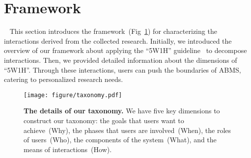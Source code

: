 \section{Framework}~\label{framework}
This section introduces the framework~(Fig~\ref{fig:tax}) for characterizing the interactions derived from the collected research.
Initially, we introduced the overview of our framework about applying the ``5W1H'' guideline~\cite{ram_5ws_2018} to decompose interactions.
Then, we provided detailed information about the dimensions of ``5W1H''.
Through these interactions, users can push the boundaries of ABMS, catering to personalized research needs.

\begin{figure}[htp]
  \centering
  \texttt{[image: figure/taxonomy.pdf]}
  \caption{%
    \textbf{The details of our taxonomy.} We have five key dimensions to construct our taxonomy: the goals that users want to achieve~(Why), the phases that users are involved~(When), the roles of users~(Who), the components of the system~(What), and the means of interactions~(How).}
  \label{fig:tax}
\end{figure}

